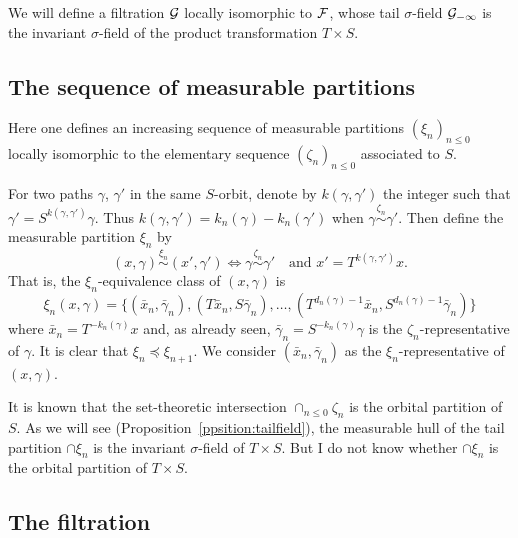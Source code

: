 \documentclass[12pt,a4paper]{article}
\begin{document}
We will define a filtration $\mathcal{G}$ locally isomorphic to $\mathcal{F}$, whose 
tail $\sigma$-field $\mathcal{G}_{-\infty}$ is the invariant $\sigma$-field of 
the product transformation $T \times S$. 


\subsection{The sequence of measurable partitions}

Here one defines an increasing sequence of measurable partitions ${(\xi_n)}_{n \leq 0}$ 
locally isomorphic to the elementary sequence ${(\zeta_n)}_{n \leq 0}$ associated to $S$. 

For two paths $\gamma$, $\gamma'$ in the same $S$-orbit, denote by $k(\gamma,\gamma')$ 
the integer such that $\gamma'=S^{k(\gamma,\gamma')}\gamma$. 
Thus $k(\gamma,\gamma') = k_n(\gamma)-k_n(\gamma')$ when $\gamma \overset{\zeta_n}{\sim} \gamma'$. 
Then define the measurable partition $\xi_n$ by 
$$
\boxed{(x, \gamma) \overset{\xi_n}{\sim} (x', \gamma') \iff 
\gamma \overset{\zeta_n}{\sim} \gamma' \quad 
\text{and $x'=T^{k(\gamma,\gamma')}x$}}. 
$$
That is, the $\xi_n$-equivalence class of $(x,\gamma)$ is 
$$
\boxed{\xi_n(x,\gamma) = \bigl\{(\bar x_n, \bar\gamma_n), (T\bar x_n, S\bar\gamma_n), 
\ldots, (T^{d_n(\gamma)-1}\bar x_n, S^{d_n(\gamma)-1}\bar\gamma_n) \bigr\}}
$$
where $\bar x_n = T^{-k_n(\gamma)}x$ and, as already seen, 
$\bar\gamma_n = S^{-k_n(\gamma)}\gamma$ is the $\zeta_n$-representative of 
$\gamma$. 
It is clear that $\xi_n \preceq \xi_{n+1}$. 
We  consider $(\bar x_n, \bar\gamma_n)$ as the $\xi_n$-representative of
$(x,\gamma)$. 

\begin{remark}
It is known that the set-theoretic intersection 
$\cap_{n \leq 0} \zeta_n$ is the orbital partition of $S$. 
As we will see (Proposition~\ref{ppsition:tailfield}), 
the measurable hull of the tail partition $\cap \xi_n$ is 
the invariant $\sigma$-field of $T \times S$. 
But I do not know whether $\cap \xi_n$ 
is the orbital partition of $T \times S$.
\end{remark}

\subsection{The filtration} 
\end{document}
